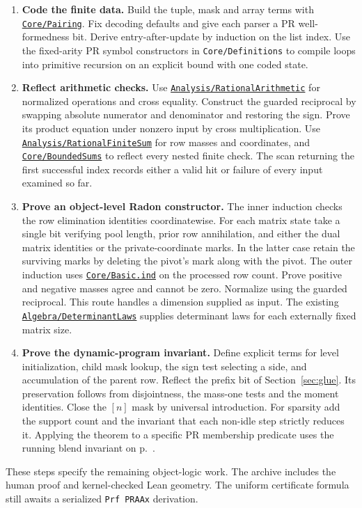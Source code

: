 \documentclass[11pt,letterpaper]{article}
\newcommand{\repo}{https://github.com/VladimirReshetnikov/ProveIt}
\newcommand{\pin}{022dfb4c54c22782f927a903f25bcf6491b7eba2}
\newcommand{\basepath}{Logic/PrimitiveRecursiveArithmetic}
\newcommand{\gh}[2]{\href{\repo/blob/\pin/\basepath/#1}{#2}}
\theoremstyle{packet}\newtheorem{theorem}{Theorem}\newtheorem{lem}[theorem]{Lemma}
\begin{document}
\begin{enumerate}[leftmargin=1.8em,itemsep=4pt]
\item \textbf{Code the finite data.} Build the tuple, mask and array terms with \gh{Derivations/Lean/IPRADerivations/Core/Pairing.lean}{\texttt{Core/Pairing}}. Fix decoding defaults and give each parser a PR well-formedness bit. Derive entry-after-update by induction on the list index. Use the fixed-arity PR symbol constructors in \texttt{Core/Definitions} to compile loops into primitive recursion on an explicit bound with one coded state.
\item \textbf{Reflect arithmetic checks.} Use \gh{Derivations/Lean/IPRADerivations/Analysis/RationalArithmetic.lean}{\texttt{Analysis/RationalArithmetic}} for normalized operations and cross equality. Construct the guarded reciprocal by swapping absolute numerator and denominator and restoring the sign. Prove its product equation under nonzero input by cross multiplication. Use \gh{Derivations/Lean/IPRADerivations/Analysis/RationalFiniteSum.lean}{\texttt{Analysis/RationalFiniteSum}} for row masses and coordinates, and \gh{Derivations/Lean/IPRADerivations/Core/BoundedSums.lean}{\texttt{Core/BoundedSums}} to reflect every nested finite check. The scan returning the first successful index records either a valid hit or failure of every input examined so far.
\item \textbf{Prove an object-level Radon constructor.} The inner induction checks the row elimination identities coordinatewise. For each matrix state take a single bit verifying pool length, prior row annihilation, and either the dual matrix identities or the private-coordinate marks. In the latter case retain the surviving marks by deleting the pivot's mark along with the pivot. The outer induction uses \gh{Derivations/Lean/IPRADerivations/Core/Basic.lean}{\texttt{Core/Basic.ind}} on the processed row count. Prove positive and negative masses agree and cannot be zero. Normalize using the guarded reciprocal. This route handles a dimension supplied as input. The existing \gh{Derivations/Lean/IPRADerivations/Algebra/DeterminantLaws.lean}{\texttt{Algebra/DeterminantLaws}} supplies determinant laws for each externally fixed matrix size.
\item \textbf{Prove the dynamic-program invariant.} Define explicit terms for level initialization, child mask lookup, the sign test selecting a side, and accumulation of the parent row. Reflect the prefix bit of Section~\ref{sec:glue}. Its preservation follows from disjointness, the mass-one tests and the moment identities. Close the $[n]$ mask by universal introduction. For sparsity add the support count and the invariant that each non-idle step strictly reduces it. Applying the theorem to a specific PR membership predicate uses the running blend invariant on p.~\pageref{sec:codes}.
\end{enumerate}
These steps specify the remaining object-logic work. The archive includes the human proof and kernel-checked Lean geometry. The uniform certificate formula still awaits a serialized \texttt{Prf PRAAx} derivation.
\end{document}
